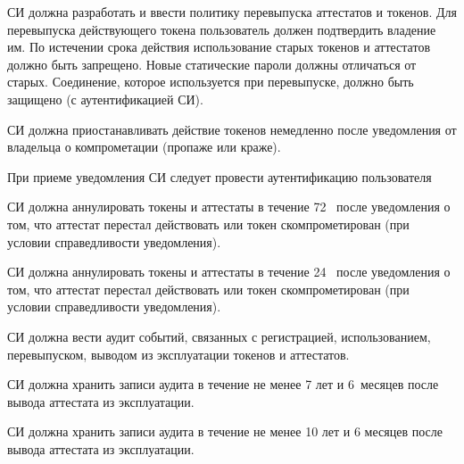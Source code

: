 СИ должна разработать и ввести политику перевыпуска аттестатов и токенов.
Для перевыпуска действующего токена пользователь должен 
подтвердить владение им. По истечении срока действия
использование старых токенов и аттестатов должно быть запрещено. 
Новые статические пароли должны отличаться от старых. 
Соединение, которое используется при перевыпуске, должно быть защищено 
(с аутентификацией СИ). 




СИ должна приостанавливать действие токенов немедленно после 
уведомления от владельца о компрометации (пропаже или краже).
%

\begin{note*}
При приеме уведомления СИ следует провести аутентификацию пользователя
\end{note*}


СИ должна аннулировать токены и аттестаты в течение 72~ 
после уведомления о том, что аттестат перестал действовать 
или токен скомпрометирован (при условии справедливости уведомления).

СИ должна аннулировать токены и аттестаты в течение 24~ 
после уведомления о том, что аттестат перестал действовать 
или токен скомпрометирован (при условии справедливости уведомления). 

СИ должна вести аудит событий, связанных с регистрацией, использованием, 
перевыпуском, выводом из эксплуатации токенов и аттестатов.  


СИ должна хранить записи аудита в течение не менее 7 лет и 6~месяцев после 
вывода аттестата из эксплуатации.  

СИ должна хранить записи аудита в течение не менее 10 лет и 6 месяцев 
после вывода аттестата из эксплуатации.  
